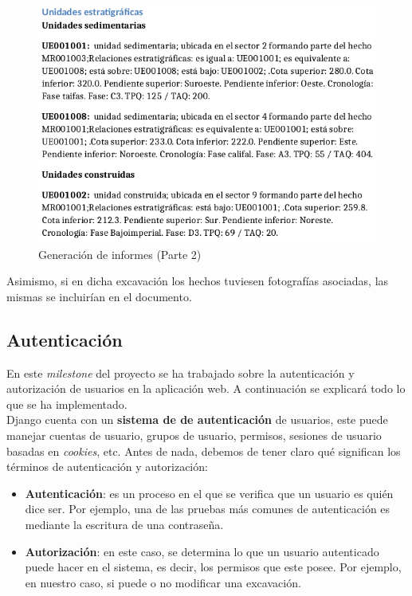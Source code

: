     \begin{figure}[H]
        \centering
        \includegraphics[scale=0.54]{imagenes/report-generator2.png}
        \caption{Generación de informes (Parte 2)}
        \label{fig:report-generator2}
    \end{figure}

Asimismo, si en dicha excavación los hechos tuviesen fotografías asociadas, las mismas
se incluirían en el documento.

\subsection{Autenticación}
En este \textit{milestone} del proyecto se ha trabajado sobre la autenticación y
autorización de usuarios en la aplicación web. A continuación se explicará todo lo que se
ha implementado.\\

Django cuenta con un \textbf{sistema de de autenticación} \cite{django-auth} de usuarios,
este puede manejar cuentas de usuario, grupos de usuario, permisos, sesiones de usuario
basadas en \textit{cookies}, etc. Antes de nada, debemos de tener claro qué significan los
términos de autenticación y autorización:

    \begin{itemize}
        \item \textbf{Autenticación}: es un proceso en el que se verifica que un usuario
        es quién dice ser. Por ejemplo, una de las pruebas más comunes de autenticación
        es mediante la escritura de una contraseña.
        \item \textbf{Autorización}: en este caso, se determina lo que un usuario
        autenticado puede hacer en el sistema, es decir, los permisos que este posee. Por
        ejemplo, en nuestro caso, si puede o no modificar una excavación.
    \end{itemize}

